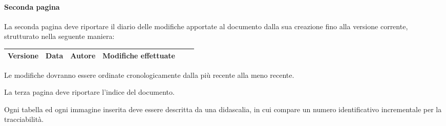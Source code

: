 \paragraph{Seconda pagina}
\label{5.2.4}
La seconda pagina deve riportare il diario delle modifiche apportate al documento dalla sua creazione fino alla versione corrente, strutturato nella seguente maniera:

\begin{center}
\begin{longtable}{|c|c|c|p{0.5\linewidth}|}
\toprule
\textbf{Versione} & \textbf{Data} & \textbf{Autore} & \textbf{Modifiche effettuate}\\

\bottomrule
\end{longtable}
\end{center}
Le modifiche dovranno essere ordinate cronologicamente dalla più recente alla meno recente.



La terza pagina deve riportare l'indice del documento.


Ogni tabella ed ogni immagine inserita deve essere descritta da una didascalia, in cui compare un numero identificativo incrementale per la tracciabilità.

